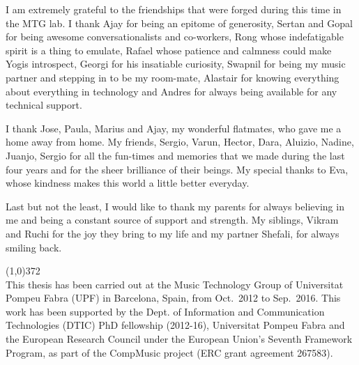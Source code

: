 I am extremely grateful to the friendships that were forged during this time in the MTG lab. I thank Ajay for being an epitome of generosity, Sertan and Gopal for being awesome conversationalists and co-workers, Rong whose indefatigable spirit is a thing to emulate, Rafael whose patience and calmness could make Yogis introspect, Georgi for his insatiable curiosity, Swapnil for being my music partner and stepping in to be my room-mate, Alastair for knowing everything about everything in technology and Andres for always being available for any technical support.

I thank Jose, Paula, Marius and Ajay, my wonderful flatmates, who gave me a home away from home. My friends, Sergio, Varun, Hector, Dara, Aluizio, Nadine, Juanjo, Sergio for all the fun-times and memories that we made during the last four years and for the sheer brilliance of their beings. My special thanks to Eva, whose kindness makes this world a little better everyday.

Last but not the least, I would like to thank my parents for always believing in me and being a constant source of support and strength. My siblings, Vikram and Ruchi for the joy they bring to my life and my partner Shefali, for always smiling back.


\vspace*{\fill}

\line(1,0){372}\\
\footnotesize
This thesis has been carried out at the Music Technology Group of Universitat Pompeu Fabra (UPF) in Barcelona, Spain, from Oct.~2012 to Sep.~2016. This work has been supported by the Dept. of Information and Communication Technologies (DTIC) PhD fellowship (2012-16), Universitat Pompeu Fabra and the European Research Council under the European Union’s Seventh Framework Program, as part of the CompMusic project (ERC grant agreement 267583).
\normalsize